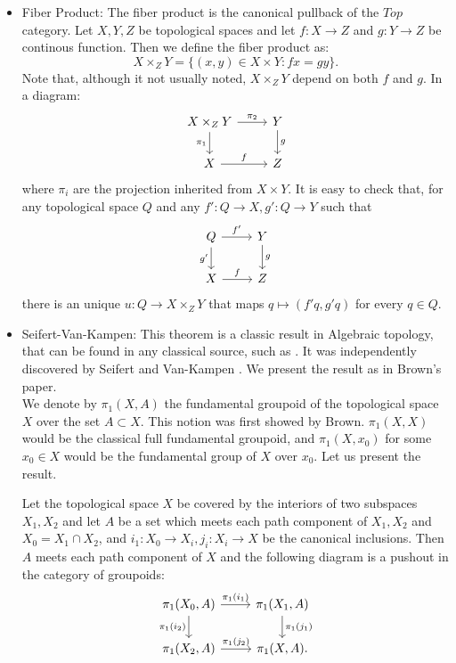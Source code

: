 \begin{example}
  \begin{itemize}
  \item Fiber Product: The fiber product is the canonical pullback of the $Top$ category. Let $X,Y,Z$ be topological spaces and let $f:X\to Z$ and $g: Y\to Z$ be continous function. Then we define the fiber product as:
    $$X\times_ZY = \{(x,y) \in X\times Y: fx=gy\}.$$ Note that, although it not usually noted, $X\times_Z Y$ depend on both $f$ and $g$. In a diagram:
    \[
      \begin{tikzcd}
        X\times_Z Y\arrow{r}{\pi_2}\arrow[swap]{d}{\pi_1} & Y\arrow{d}{g}\\
        X\arrow{r}{f} & Z
      \end{tikzcd}
    \]
    where $\pi_i$ are the projection inherited from $X\times Y$. It is easy to check that, for any topological space $Q$ and any $f':Q\to X, g': Q \to Y$ such that
    \[
      \begin{tikzcd}
        Q\arrow{r}{f'}\arrow[swap]{d}{g'} & Y\arrow{d}{g}\\
        X\arrow{r}{f} & Z
      \end{tikzcd}
    \]
    there is an unique $u:Q\to X\times_Z Y$ that maps $q\mapsto (f'q,g'q)$ for every $q\in Q$.\\
  \item Seifert-Van-Kampen: This theorem is a classic result in Algebraic topology, that can be found in any classical source, such as \cite{munkres2000topology}. It was independently discovered by Seifert \cite{seifert1931konstruktion} and Van-Kampen \cite{van1933connection}.  We present the result as in  Brown's paper\cite{brown1967groupoids}.\\

    We denote by $\pi_1(X,A)$ the fundamental groupoid of the topological space $X$ over the set $A\subset X$. This notion was first showed by Brown. $\pi_1(X,X)$ would be the classical full fundamental groupoid, and $\pi_1(X,x_0)$ for some $x_0\in X$ would be the fundamental group of $X$ over $x_0$. Let us present the result.
    \begin{theorem}
      Let the topological space $X$  be covered by the interiors of two subspaces $X_1,X_2$ and let $A$
      be a set which meets each path component of $X_1, X_2$ and $X_0=X_1\cap X_2$, and $i_1: X_0 \to X_i,j_i: X_i \to X $ be the canonical inclusions. Then $A$  meets each path component of $X$  and the following diagram is a pushout in the category of groupoids:
      \[
        \begin{tikzcd}
          \pi_1(X_0,A)\arrow{r}{\pi_1(i_1)}\arrow[swap]{d}{\pi_1(i_2)} & \pi_1(X_1,A)\arrow{d}{\pi_1(j_1)}\\
          \pi_1(X_2,A)\arrow{r}{\pi_1(j_2)} & \pi_1(X,A).\\
        \end{tikzcd}
      \]

    \end{theorem}


  \end{itemize}
\end{example}

